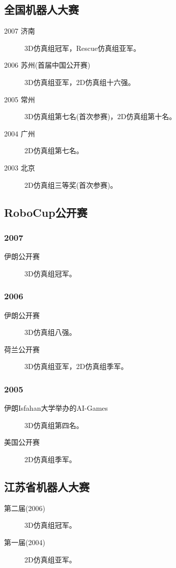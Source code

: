 \subsection{全国机器人大赛}
\begin{description}
\item[2007 济南] 3D仿真组冠军，Rescue仿真组亚军。
\item[2006 苏州(首届中国公开赛)] 3D仿真组亚军，2D仿真组十六强。
\item[2005 常州] 3D仿真组第七名(首次参赛)，2D仿真组第十名。
\item[2004 广州] 2D仿真组第七名。
\item[2003 北京] 2D仿真组三等奖(首次参赛)。
\end{description}

\subsection{RoboCup公开赛}

\subsubsection{2007}
\begin{description}
\item[伊朗公开赛] 3D仿真组冠军。
\end{description}

\subsubsection{2006}
\begin{description}
\item[伊朗公开赛] 3D仿真组八强。
\item[荷兰公开赛] 3D仿真组亚军，2D仿真组季军。
\end{description}

\subsubsection{2005}
\begin{description}
\item[伊朗Isfahan大学举办的AI-Games] 3D仿真组第四名。
\item[美国公开赛] 2D仿真组季军。
\end{description}

\subsection{江苏省机器人大赛}
\begin{description}
\item[第二届(2006)] 3D仿真组冠军。
\item[第一届(2004)] 2D仿真组亚军。
\end{description}

